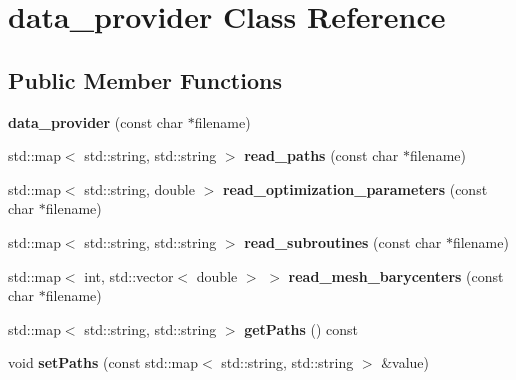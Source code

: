 \hypertarget{classdata__provider}{}\section{data\+\_\+provider Class Reference}
\label{classdata__provider}
\subsection*{Public Member Functions}
\begin{DoxyCompactItemize}
\item 
\mbox{\label{classdata__provider_a4d2e7c78af926b120867d7bcad45bacb}} 
{\bfseries data\+\_\+provider} (const char $\ast$filename)
\item 
\mbox{\label{classdata__provider_afed7cb89f200a022255741d8e8f0f83c}} 
std\+::map$<$ std\+::string, std\+::string $>$ {\bfseries read\+\_\+paths} (const char $\ast$filename)
\item 
\mbox{\label{classdata__provider_a4747bfb4fc440afa9f2f7352a27af380}} 
std\+::map$<$ std\+::string, double $>$ {\bfseries read\+\_\+optimization\+\_\+parameters} (const char $\ast$filename)
\item 
\mbox{\label{classdata__provider_ac4b4250551f579d21034b5174eca4cd0}} 
std\+::map$<$ std\+::string, std\+::string $>$ {\bfseries read\+\_\+subroutines} (const char $\ast$filename)
\item 
\mbox{\label{classdata__provider_ac250dbe9a8c1c0bea8c621240984fbe8}} 
std\+::map$<$ int, std\+::vector$<$ double $>$ $>$ {\bfseries read\+\_\+mesh\+\_\+barycenters} (const char $\ast$filename)
\item 
\mbox{\label{classdata__provider_a98dcca489cb8ed79edde03809ba49859}} 
std\+::map$<$ std\+::string, std\+::string $>$ {\bfseries get\+Paths} () const
\item 
\mbox{\label{classdata__provider_af3eca2ee0b5b74031e2d8379ca5f6b66}} 
void {\bfseries set\+Paths} (const std\+::map$<$ std\+::string, std\+::string $>$ \&value)
\item 
\mbox{\label{classdata__provider_a80afd00b015247661d2b1fc2695a2655}} 

\end{DoxyCompactItemize}
